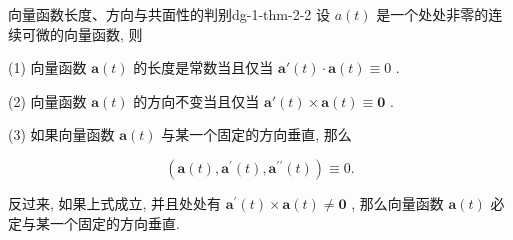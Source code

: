 \begin{theorem}{向量函数长度、方向与共面性的判别}{dg-1-thm-2-2}
设 \(a(t)\) 是一个处处非零的连续可微的向量函数, 则\par

(1) 向量函数  \(\boldsymbol{a}(t)\)  的长度是常数当且仅当  \(\boldsymbol{a}'(t) \cdot \boldsymbol{a}(t) \equiv 0\) .\par

(2) 向量函数  \(\boldsymbol{a}(t)\)  的方向不变当且仅当  \(\boldsymbol{a}'(t) \times \boldsymbol{a}(t) \equiv \boldsymbol{0}\) .\par

(3) 如果向量函数  \(\boldsymbol{a}(t)\)  与某一个固定的方向垂直, 那么\par

\[
(\boldsymbol {a} (t), \boldsymbol {a} ^ {\prime} (t), \boldsymbol {a} ^ {\prime \prime} (t)) \equiv 0.
\]

反过来, 如果上式成立, 并且处处有  \(\boldsymbol{a}^{\prime}(t) \times \boldsymbol{a}(t) \neq \boldsymbol{0}\) , 那么向量函数  \(\boldsymbol{a}(t)\)  必定与某一个固定的方向垂直.
\end{theorem}
